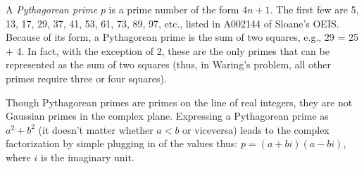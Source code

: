 \documentclass[12pt]{article}
\begin{document}
A {\em Pythagorean prime} $p$ is a prime number of the form $4n + 1$. The first few are 5, 13, 17, 29, 37, 41, 53, 61, 73, 89, 97, etc., listed in A002144 of Sloane's OEIS. Because of its form, a Pythagorean prime is the sum of two squares, e.g., 29 = 25 + 4. In fact, with the exception of 2, these are the only primes that can be represented as the sum of two squares (thus, in Waring's problem, all other primes require three or four squares).

Though Pythagorean primes are primes on the line of real integers, they are not Gaussian primes in the complex plane. Expressing a Pythagorean prime as $a^2 + b^2$ (it doesn't matter whether $a < b$ or viceversa) leads to the complex factorization by simple plugging in of the values thus: $p = (a + bi)(a - bi)$, where $i$ is the imaginary unit.
\end{document}
